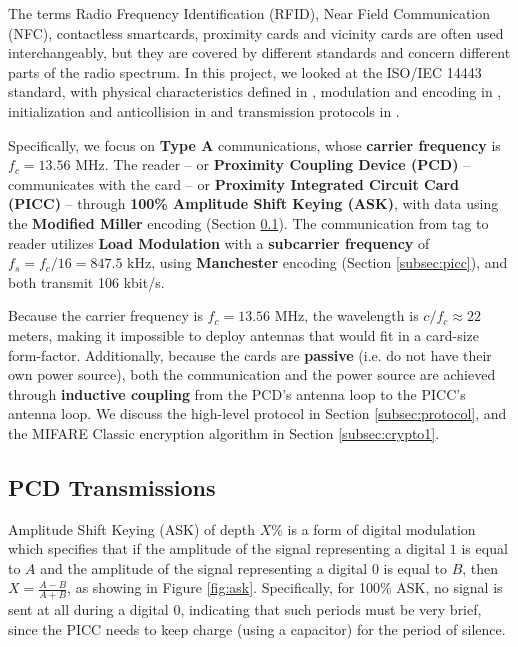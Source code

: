 \documentclass[fleqn,10pt]{SelfArx} %
\begin{document}
The terms Radio Frequency Identification (RFID), Near Field Communication (NFC), contactless smartcards, proximity cards and vicinity cards are often used interchangeably, but they are covered by different standards and concern different parts of the radio spectrum. In this project, we looked at the ISO/IEC 14443 standard, with physical characteristics defined in \cite{iso144431}, modulation and encoding in \cite{iso144432}, initialization and anticollision in \cite{iso144433} and transmission protocols in \cite{iso144434}.

Specifically, we focus on {\bf Type A} communications, whose {\bf carrier frequency} is $f_c=13.56$ MHz. The reader -- or {\bf Proximity Coupling Device (PCD)} -- communicates with the card -- or {\bf Proximity Integrated Circuit Card (PICC)} -- through {\bf 100\% Amplitude Shift Keying (ASK)}, with data using the {\bf Modified Miller} encoding (Section \ref{subsec:pcd}). The communication from tag to reader utilizes {\bf Load Modulation} with a {\bf subcarrier frequency} of $f_s=f_c/16=847.5$ kHz, using {\bf Manchester} encoding (Section \ref{subsec:picc}), and both transmit 106 kbit/s. 

Because the carrier frequency is $f_c=13.56$ MHz, the wavelength is $c/f_c\approx22$ meters, making it impossible to deploy antennas that would fit in a card-size form-factor. Additionally, because the cards are {\bf passive} (i.e. do not have their own power source), both the communication and the power source are achieved through {\bf inductive coupling} from the PCD's antenna loop to the PICC's antenna loop. We discuss the high-level protocol in Section \ref{subsec:protocol}, and the MIFARE Classic encryption algorithm in Section \ref{subsec:crypto1}.

\subsection{PCD Transmissions}
\label{subsec:pcd}

Amplitude Shift Keying (ASK) of depth $X$\% is a form of digital modulation which specifies that if the amplitude of the signal representing a digital $1$ is equal to $A$ and the amplitude of the signal representing a digital $0$ is equal to $B$, then $X=\frac{A-B}{A+B}$, as showing in Figure \ref{fig:ask}. Specifically, for 100\% ASK, no signal is sent at all during a digital $0$, indicating that such periods must be very brief, since the PICC needs to keep charge (using a capacitor) for the period of silence.
\end{document}
